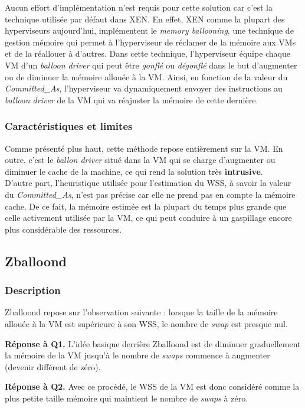
Aucun effort d'implémentation n'est requis pour cette solution car c'est la technique utilisée par défaut dans XEN. En effet, XEN comme la plupart des hyperviseurs aujourd'hui, implémentent le \textit{memory ballooning}\cite{article9, article10}, une technique de gestion mémoire qui permet à l'hyperviseur de réclamer de la mémoire aux VMs et de la réallouer à d'autres. Dans cette technique, l'hyperviseur équipe chaque VM d'un \textit{balloon driver} qui peut être \textit{gonflé} ou \textit{dégonflé} dans le but d'augmenter ou de diminuer la mémoire allouée à la VM. Ainsi, en fonction de la valeur du \textit{Committed\_As}, l'hyperviseur va dynamiquement envoyer des instructions au \textit{balloon driver} de la VM qui va réajuster la mémoire de cette dernière.

\subsubsection{Caractéristiques et limites}
Comme présenté plus haut, cette méthode repose entièrement sur la VM. En outre, c'est le \textit{ballon driver} situé dans la VM qui se charge d'augmenter ou diminuer le cache de la machine, ce qui rend la solution très \textbf{intrusive}.\\
D'autre part, l'heuristique utilisée pour l'estimation du WSS, à savoir la valeur du \textit{Committed\_As}, n'est pas précise car elle ne prend pas en compte la mémoire cache. De ce fait, la mémoire estimée est la plupart du temps plus grande que celle activement utilisée par la VM, ce qui peut conduire à un gaspillage encore plus considérable des ressources.

\subsection{Zballoond}

\subsubsection{Description}
Zballoond \cite{zballoond} repose sur l'observation suivante : lorsque la taille de la mémoire allouée à la VM est supérieure à son WSS, le nombre de \textit{swap} est presque nul.
\par{\textbf{Réponse à Q1.}} L'idée basique derrière Zballoond est de diminuer graduellement la mémoire de la VM jusqu'à le nombre de \textit{swaps} commence à augmenter (devenir différent de zéro).

\par{\textbf{Réponse à Q2.}} Avec ce procédé, le WSS de la VM est donc considéré comme la plus petite taille mémoire qui maintient le nombre de \textit{swaps} à zéro.

